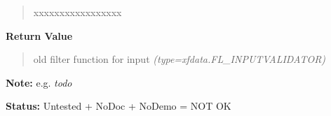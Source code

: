 \begin{boxedminipage}{\funcwidth}
\begin{quote}
\begin{Ventry}{xxxxxxxxxxxxxxxxx}
        \end{Ventry}

      \end{quote}

      \textbf{Return Value}
    \vspace{-1ex}

      \begin{quote}

old filter function for input
      {\it (type=xfdata.FL\_INPUTVALIDATOR)}

      \end{quote}

\textbf{Note:} 
e.g. \emph{todo}


\textbf{Status:} 
Untested + NoDoc + NoDemo = NOT OK


    \end{boxedminipage}

    \label{xformslib:flinput:fl_validate_input}

    \vspace{0.5ex}

